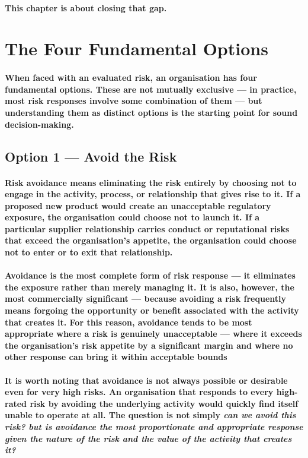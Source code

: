 \paragraph{This chapter is about closing that gap.}

\section{The Four Fundamental Options}
\paragraph{When faced with an evaluated risk, an organisation has four fundamental options. These are not mutually exclusive — in practice, most risk responses involve some combination of them — but understanding them as distinct options is the starting point for sound decision-making.}

\subsection{Option 1 — Avoid the Risk}
\paragraph{\textbf{Risk avoidance} means eliminating the risk entirely by choosing not to engage in the activity, process, or relationship that gives rise to it. If a proposed new product would create an unacceptable regulatory exposure, the organisation could choose not to launch it. If a particular supplier relationship carries conduct or reputational risks that exceed the organisation's appetite, the organisation could choose not to enter or to exit that relationship.}
\paragraph{Avoidance is the most complete form of risk response — it eliminates the exposure rather than merely managing it. It is also, however, the most commercially significant — because avoiding a risk frequently means forgoing the opportunity or benefit associated with the activity that creates it. For this reason, avoidance tends to be most appropriate where a risk is genuinely unacceptable — where it exceeds the organisation's risk appetite by a significant margin and where no other response can bring it within acceptable bounds}
\paragraph{It is worth noting that avoidance is not always possible or desirable even for very high risks. An organisation that responds to every high-rated risk by avoiding the underlying activity would quickly find itself unable to operate at all. The question is not simply \textit{can we avoid this risk? but is avoidance the most proportionate and appropriate response given the nature of the risk and the value of the activity that creates it?}}

